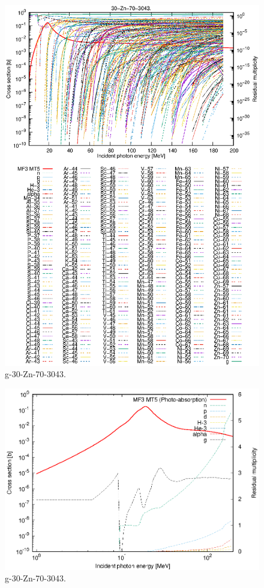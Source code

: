 \begin{figure}
 \includegraphics[width=\linewidth]{eps/g_30-Zn-70_3043.eps}
  \caption{g-30-Zn-70-3043.}
\end{figure}
\newpage \clearpage

\begin{figure}
 \includegraphics[width=\linewidth]{eps-log/g_30-Zn-70_3043.eps}
 \caption{g-30-Zn-70-3043.}
\end{figure}
\newpage \clearpage

